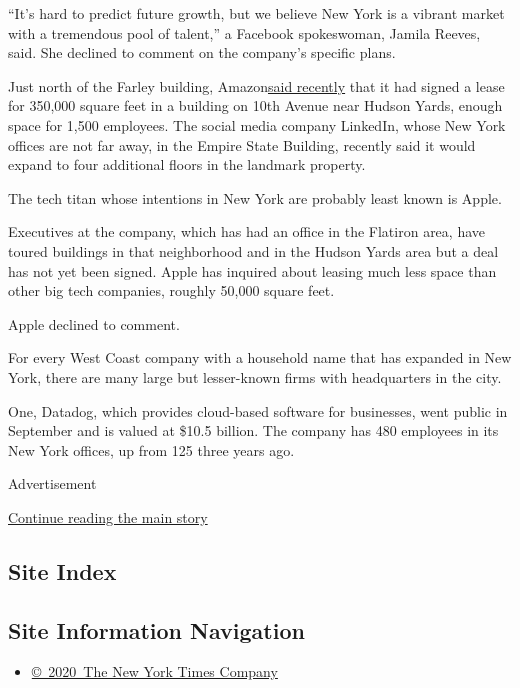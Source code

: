 ``It's hard to predict future growth, but we believe New York is a
vibrant market with a tremendous pool of talent,'' a Facebook
spokeswoman, Jamila Reeves, said. She declined to comment on the
company's specific plans.

Just north of the Farley building,
Amazon\href{https://www.nytimes.com/2019/12/06/nyregion/amazon-hudson-yards.html}{said
recently} that it had signed a lease for 350,000 square feet in a
building on 10th Avenue near Hudson Yards, enough space for 1,500
employees. The social media company LinkedIn, whose New York offices are
not far away, in the Empire State Building, recently said it would
expand to four additional floors in the landmark property.

The tech titan whose intentions in New York are probably least known is
Apple.

Executives at the company, which has had an office in the Flatiron area,
have toured buildings in that neighborhood and in the Hudson Yards area
but a deal has not yet been signed. Apple has inquired about leasing
much less space than other big tech companies, roughly 50,000 square
feet.

Apple declined to comment.

For every West Coast company with a household name that has expanded in
New York, there are many large but lesser-known firms with headquarters
in the city.

One, Datadog, which provides cloud-based software for businesses, went
public in September and is valued at \$10.5 billion. The company has 480
employees in its New York offices, up from 125 three years ago.

Advertisement

\protect\hyperlink{after-bottom}{Continue reading the main story}

\hypertarget{site-index}{%
\subsection{Site Index}\label{site-index}}

\hypertarget{site-information-navigation}{%
\subsection{Site Information
Navigation}\label{site-information-navigation}}

\begin{itemize}
\tightlist
\item
  \href{https://help.nytimes.com/hc/en-us/articles/115014792127-Copyright-notice}{©~2020~The
  New York Times Company}
\end{itemize}

